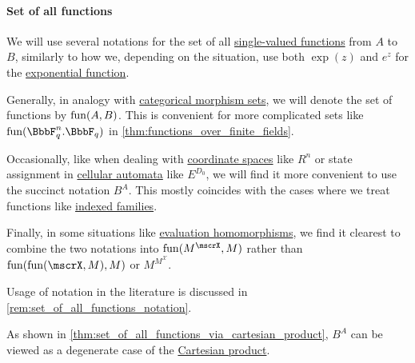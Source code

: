 \paragraph{Set of all functions}

\begin{definition}\label{def:set_of_all_functions}\mimprovised
  We will use several notations for the set of all \hyperref[def:function]{single-valued functions} from \( A \) to \( B \), similarly to how we, depending on the situation, use both \( \exp(z) \) and \( e^z \) for the \hyperref[def:exponential_function]{exponential function}.

  Generally, in analogy with \hyperref[def:category/morphisms]{categorical morphism sets}, we will denote the set of functions by \( \operatorname{fun}(A, B) \). This is convenient for more complicated sets like \( \fun(\BbbF_q^n. \BbbF_q) \) in \cref{thm:functions_over_finite_fields}.

  Occasionally, like when dealing with \hyperref[def:coordinate_space]{coordinate spaces} like \( R^n \) or state assignment in \hyperref[def:cellular_automaton]{cellular automata} like \( E^{D_0} \), we will find it more convenient to use the succinct notation \( B^A \). This mostly coincides with the cases where we treat functions like \hyperref[def:indexed_family]{indexed families}.

  Finally, in some situations like \hyperref[con:evaluation_homomorphism]{evaluation homomorphisms}, we find it clearest to combine the two notations into \( \fun(M^\mscrX, M) \) rather than \( \fun(\fun(\mscrX, M), M) \) or \( M^{M^\mscrX} \).
\end{definition}
\begin{comments}
  \item Usage of notation in the literature is discussed in \cref{rem:set_of_all_functions_notation}.

  \item As shown in \cref{thm:set_of_all_functions_via_cartesian_product}, \( B^A \) can be viewed as a degenerate case of the \hyperref[def:cartesian_product]{Cartesian product}.
\end{comments}


